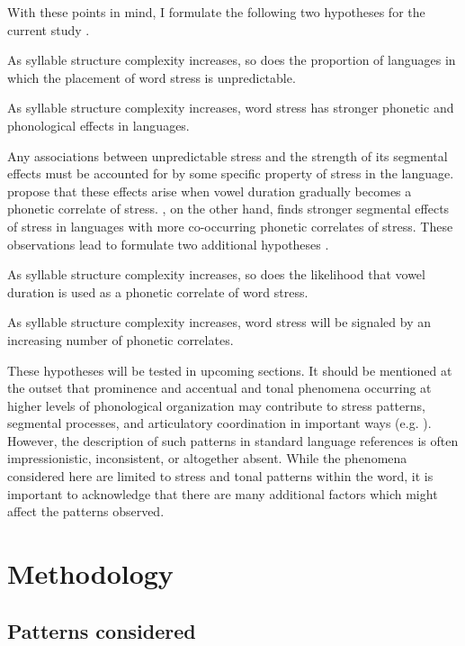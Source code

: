   With these points in mind, I formulate the following two hypotheses for the current study .

\ea\label{ex:5.4}
  As syllable structure complexity increases, so does the proportion of languages in which the placement of word stress is unpredictable.
\z
  
\ea\label{ex:5.5}
  As syllable structure complexity increases, word stress has stronger phonetic and phonological effects in languages.
\z

  Any associations between unpredictable stress and the strength of its segmental effects must be accounted for by some specific property of stress in the language. \citet{BybeeEtAl1998} propose that these effects arise when vowel duration gradually becomes a phonetic correlate of stress. \citet{Schiering2007}, on the other hand, finds stronger segmental effects of stress in languages with more co-occurring phonetic correlates of stress. These observations lead to formulate two additional hypotheses .

\ea\label{ex:5.6}
  As syllable structure complexity increases, so does the likelihood that vowel duration is used as a phonetic correlate of word stress.
\z

\ea\label{ex:5.7}
  As syllable structure complexity increases, word stress will be signaled by an increasing number of phonetic correlates.
\z

  These hypotheses will be tested in upcoming sections. It should be mentioned at the outset that prominence and accentual and tonal phenomena occurring at higher levels of phonological organization may contribute to stress patterns, segmental processes, and articulatory coordination in important ways (e.g. \citealt{FougeronKeating1997}). However, the description of such patterns in standard language references is often impressionistic, inconsistent, or altogether absent. While the phenomena considered here are limited to stress and tonal patterns within the word, it is important to acknowledge that there are many additional factors which might affect the patterns observed.

\section{Methodology}\label{sec:5.2}
\subsection{Patterns considered}\label{sec:5.2.1}

